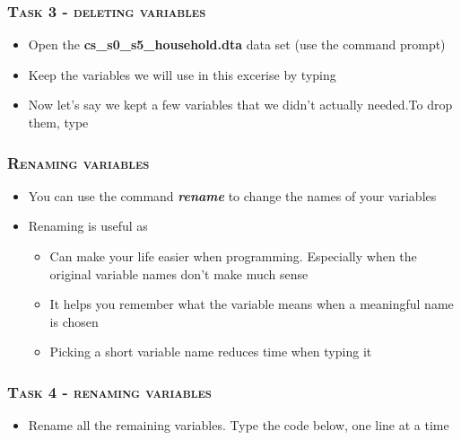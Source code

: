 \documentclass[10pt]{beamer}
\begin{document}
	\begin{frame}
		\frametitle{\textsc{Task 3 - deleting variables}}

		\begin{itemize}
			\item Open the \textbf{cs\_s0\_s5\_household.dta} data set (use the command prompt)
		\end{itemize}
	
		\begin{itemize}
			\item Keep the variables we will use in this excerise by typing
		\end{itemize}
	
\begin{stlog}\end{stlog}
		\begin{itemize}
			\item Now let's say we kept a few variables that we didn't actually needed.To drop them, type
		\end{itemize}
	
\begin{stlog}\end{stlog}
	\end{frame}
	
	\begin{frame}
		\frametitle{\textsc{Renaming variables}}
		\begin{itemize}
			\item You can use the command \textbf{\textit{rename}} to change the names of your variables
			\item Renaming is useful as
			\begin{itemize}
				\item Can make your life easier when programming. Especially when the original variable names don't make much sense
				\item It helps you remember what the variable means when a meaningful name is chosen
				\item Picking a short variable name reduces time when typing it
				
			\end{itemize}
		\end{itemize}
	\end{frame}
			
	\begin{frame}
		\frametitle{\textsc{Task 4 - renaming variables}}
		\begin{itemize} 
			\item Rename all the remaining variables. Type the code below, one line at a time
		\end{itemize}
\begin{stlog}\end{stlog}
	\end{frame}
	
\end{document}
